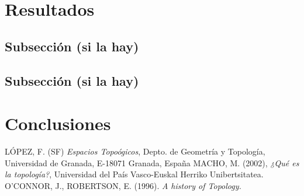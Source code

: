 \documentclass[12pt, twoside]{article} %
\begin{document}
\newpage
\section{Resultados}
\lipsum[1] %
\subsection{Subsección (si la hay)}
\lipsum %
\subsection{Subsección (si la hay)}
\lipsum %

\newpage
\section{Conclusiones}
\lipsum[5] %
\lipsum[1] %

\newpage

\begin{thebibliography}{X} %
 LÓPEZ, F. (SF) \textit{Espacios Topoógicos}, Depto. de Geometría y Topología, Universidad de Granada, E-18071 Granada, España
 MACHO, M. (2002), \textit{¿Qué es la topología?}, Universidad del País Vasco-Euskal Herriko Unibertsitatea.
 O’CONNOR, J., ROBERTSON, E. (1996). \textit{A history of Topology.}
\end{thebibliography}
\end{document}
